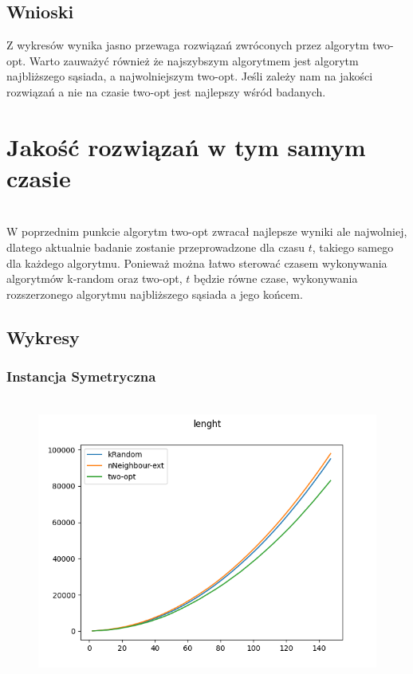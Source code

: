 \documentclass[11pt]{article}
\begin{document}
\subsection{Wnioski }   
Z wykresów wynika jasno przewaga rozwiązań zwróconych przez algorytm two-opt. Warto zauważyć również że najszybszym algorytmem jest algorytm najbliższego sąsiada, a najwolniejszym two-opt. Jeśli zależy nam na jakości rozwiązań a nie na czasie two-opt jest najlepszy wśród badanych. 
\section{Jakość rozwiązań w tym samym czasie }
\\W poprzednim punkcie algorytm two-opt zwracał najlepsze wyniki ale najwolniej, dlatego aktualnie badanie zostanie przeprowadzone dla czasu $t$, takiego samego dla każdego algorytmu. Ponieważ można łatwo sterować czasem wykonywania algorytmów k-random oraz two-opt, $t$ będzie równe czase, wykonywania rozszerzonego algorytmu najbliższego sąsiada a jego końcem.
\subsection{Wykresy }
\subsubsection{Instancja Symetryczna }
            \begin{center}
            \begin{figure}[H]

                \\ \includegraphics[scale=0.6]{images/lenght_sym_time.png}\

            \end{figure}
            \end{center}
\end{document}
